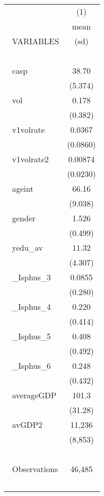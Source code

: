 \documentclass[]{article}
\begin{document}
\begin{tabular}{lc} \hline
 & (1) \\\
 & mean \\\
VARIABLES & (sd) \\\ \hline
 &  \\\
casp & 38.70 \\\
 & (5.374) \\\
vol & 0.178 \\\
 & (0.382) \\\
v1volrate & 0.0367 \\\
 & (0.0860) \\\
v1volrate2 & 0.00874 \\\
 & (0.0230) \\\
ageint & 66.16 \\\
 & (9.038) \\\
gender & 1.526 \\\
 & (0.499) \\\
yedu\_av & 11.32 \\\
 & (4.307) \\\
\_Isphus\_3 & 0.0855 \\\
 & (0.280) \\\
\_Isphus\_4 & 0.220 \\\
 & (0.414) \\\
\_Isphus\_5 & 0.408 \\\
 & (0.492) \\\
\_Isphus\_6 & 0.248 \\\
 & (0.432) \\\
averageGDP & 101.3 \\\
 & (31.28) \\\
avGDP2 & 11,236 \\\
 & (8,853) \\\
 &  \\\
 Observations & 46,485 \\\ \hline
\end{tabular}
\end{document}
